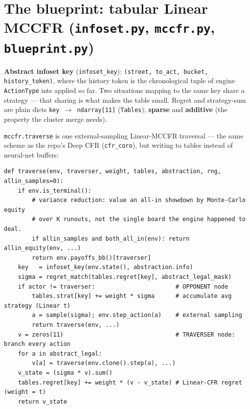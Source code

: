 \documentclass[11pt,a4paper]{article}
\newcommand{\file}[1]{\textcolor{accent}{\texttt{#1}}}
\newcommand{\fn}[1]{\texttt{#1}}
\begin{document}
\section{The blueprint: tabular Linear MCCFR (\file{infoset.py}, \file{mccfr.py}, \file{blueprint.py})}

\begin{defbox}
\textbf{Abstract infoset key} (\fn{infoset\_key}): \texttt{(street, to\_act,
bucket, history\_token)}, where the history token is the chronological tuple of
engine \texttt{ActionType} ints applied so far. Two situations mapping to the same
key share a strategy --- that sharing is what makes the table small. Regret and
strategy-sum are plain dicts \texttt{key $\to$ ndarray[11]} (\fn{Tables}),
\textbf{sparse} and \textbf{additive} (the property the cluster merge needs).
\end{defbox}

\fn{mccfr.traverse} is one external-sampling Linear-MCCFR traversal --- the same
scheme as the repo's Deep CFR (\texttt{cfr\_coro}), but writing to tables instead
of neural-net buffers:

\begin{lstlisting}[style=py, caption={\file{mccfr.py} --- the traversal. $\sigma$ is read by regret matching on the stored regrets; it is accumulated for the average strategy ONLY at opponent nodes (Brown 2019, Alg.~1), where sampling visits $\propto$ the opponent's own reach.}]
def traverse(env, traverser, weight, tables, abstraction, rng, allin_samples=0):
    if env.is_terminal():
        # variance reduction: value an all-in showdown by Monte-Carlo equity
        # over K runouts, not the single board the engine happened to deal.
        if allin_samples and both_all_in(env): return allin_equity(env, ...)
        return env.payoffs_bb()[traverser]
    key   = infoset_key(env.state(), abstraction.info)
    sigma = regret_match(tables.regret[key], abstract_legal_mask)
    if actor != traverser:                       # OPPONENT node
        tables.strat[key] += weight * sigma      # accumulate avg strategy (Linear t)
        a = sample(sigma); env.step_action(a)    # external sampling
        return traverse(env, ...)
    v = zeros(11)                                # TRAVERSER node: branch every action
    for a in abstract_legal:
        v[a] = traverse(env.clone().step(a), ...)
    v_state = (sigma * v).sum()
    tables.regret[key] += weight * (v - v_state) # Linear-CFR regret (weight = t)
    return v_state
\end{lstlisting}
\end{document}
